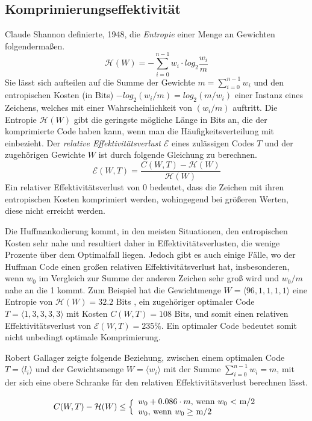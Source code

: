 \documentclass[course=erap]{aspdoc}
\begin{document}
\subsection{Komprimierungseffektivität}

Claude Shannon definierte, 1948, die \textit{Entropie} einer Menge an Gewichten folgendermaßen. \cite{6773024}
$$ \mathcal{H}(W) = - \sum_{i=0}^{n-1} w_i \cdot log_2 \frac{w_i}{m} $$
Sie lässt sich aufteilen auf die Summe der Gewichte $m = \sum_{i=0}^{n-1} w_i$ und den entropischen Kosten (in Bits) $-log_2 (w_i/m) = log_2 (m/w_i) $ einer Instanz eines Zeichens, welches mit einer Wahrscheinlichkeit von $(w_i/m)$ auftritt.
Die Entropie $\mathcal{H}(W)$ gibt die geringste mögliche Länge in Bits an, die der komprimierte Code haben kann, wenn man die Häufigkeitsverteilung mit einbezieht.
Der \textit{relative Effektivitätsverlust} $\mathcal{E}$ eines zulässigen Codes $T$ und der zugehörigen Gewichte $W$ ist durch folgende Gleichung zu berechnen.
$$ \mathcal{E}(W, T) = \frac{C(W,T) - \mathcal{H}(W)}{\mathcal{H}(W)} $$
Ein relativer Effektivitätsverlust von 0 bedeutet, dass die Zeichen mit ihren entropischen Kosten komprimiert werden, wohingegend bei größeren Werten, diese nicht erreicht werden.

Die Huffmankodierung kommt, in den meisten Situationen, den entropischen Kosten sehr nahe und resultiert daher in Effektivitätsverlusten, die wenige Prozente über dem Optimalfall liegen.
Jedoch gibt es auch einige Fälle, wo der Huffman Code einen großen relativen Effektivitätsverlust hat, insbesonderen, wenn $w_0$ im Vergleich zur Summe der anderen Zeichen sehr groß wird und $w_0 / m$ nahe an die 1 kommt.
Zum Beispiel hat die Gewichtmenge $W = \langle 96, 1, 1, 1, 1 \rangle$ eine Entropie von $\mathcal{H}(W) =
32.2$ Bits , ein zugehöriger optimaler Code $T = \langle 1, 3, 3, 3, 3 \rangle$ mit Kosten $C(W ,T) = 108 $ Bits, und somit einen
relativen Effektivitätsverlust von $\mathcal{E}(W ,T ) = 235\%$. Ein optimaler Code bedeutet somit nicht unbedingt optimale Komprimierung.

Robert Gallager \cite{1055959} zeigte folgende Beziehung, zwischen einem optimalen Code $T = \langle l_i \rangle $ und der Gewichtsmenge $W = \langle w_i \rangle$ mit der Summe $\sum_{i=0}^{n-1} w_i = m$, mit der sich eine obere Schranke für den relativen Effektivitätsverlust berechnen lässt.

$$ C(W, T) - \mathcal{H}(W) \le \Bigl\lbrace
    \begin{array}{l}
          w_0 + 0.086 \cdot m \textrm{, wenn $w_0$ < m/2}\\
          w_0 \textrm{, wenn $w_0 \ge$ m/2}\\
    \end{array} $$
\end{document}
